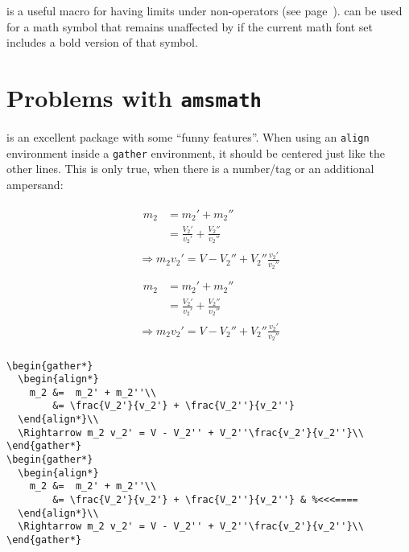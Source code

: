 \begin{table}[htb]
 is a useful macro for having limits under non-operators 
(see page~\pageref{sec:amsopn}).    %
 can be used for a math symbol that remains unaffected by
 if the current math font set includes a bold version of that symbol. 


\section{Problems with \texttt{amsmath}}
\AmSmath{} is an excellent package with some ``funny features''. 
When using an \verb+align+ environment inside a \verb+gather+ environment, it should
be centered just like the other lines. This is only true, when there is a number/tag or
an additional ampersand:


\begin{gather*}
  \begin{align*}
    m_2 &=  m_2' + m_2''\\
        &= \frac{V_2'}{v_2'} + \frac{V_2''}{v_2''}
  \end{align*}\\
  \Rightarrow m_2 v_2' = V - V_2'' + V_2''\frac{v_2'}{v_2''}\\
\end{gather*}
\begin{gather*}
  \begin{align*}
    m_2 &=  m_2' + m_2''\\
        &= \frac{V_2'}{v_2'} + \frac{V_2''}{v_2''} & %
  \end{align*}\\
  \Rightarrow m_2 v_2' = V - V_2'' + V_2''\frac{v_2'}{v_2''}\\
\end{gather*}

\begin{lstlisting}
\begin{gather*}
  \begin{align*}
    m_2 &=  m_2' + m_2''\\
        &= \frac{V_2'}{v_2'} + \frac{V_2''}{v_2''}
  \end{align*}\\
  \Rightarrow m_2 v_2' = V - V_2'' + V_2''\frac{v_2'}{v_2''}\\
\end{gather*}
\begin{gather*}
  \begin{align*}
    m_2 &=  m_2' + m_2''\\
        &= \frac{V_2'}{v_2'} + \frac{V_2''}{v_2''} & %<<<====
  \end{align*}\\
  \Rightarrow m_2 v_2' = V - V_2'' + V_2''\frac{v_2'}{v_2''}\\
\end{gather*}
\end{lstlisting}



\end{table}
